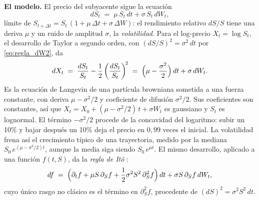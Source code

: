 \noindent\textbf{El modelo.}
El precio del subyacente sigue la ecuación
\begin{equation}\label{eq:bs_eds_P}
  dS_t \;=\; \mu\, S_t\, dt + \sigma\, S_t\, dW_t,
\end{equation}
límite de $S_{t+\Delta t} = S_t\,(1 + \mu\,\Delta t + \sigma\,\Delta W)$:
el rendimiento relativo $dS/S$ tiene una deriva $\mu$ y un ruido de
amplitud $\sigma$, la \emph{volatilidad}. Para el log-precio
$X_t = \log S_t$, el desarrollo de Taylor a segundo orden, con
$(dS/S)^2 = \sigma^2\,dt$ por \eqref{eq:regla_dW2}, da
\begin{equation}\label{eq:logprecio_P}
  dX_t \;=\; \frac{dS_t}{S_t} - \frac{1}{2}\left(\frac{dS_t}{S_t}\right)^{\!2}
  \;=\; \Bigl(\mu - \frac{\sigma^2}{2}\Bigr)\, dt + \sigma\, dW_t .
\end{equation}
Es la ecuación de Langevin de una partícula browniana sometida a una
fuerza constante, con deriva $\mu - \sigma^2/2$ y coeficiente de difusión
$\sigma^2/2$. Sus coeficientes son constantes, así que
$X_t = X_0 + (\mu - \sigma^2/2)\,t + \sigma W_t$ es gaussiano y $S_t$ es
lognormal. El término $-\sigma^2/2$ procede de la concavidad del
logaritmo: subir un 10\% y bajar después un 10\% deja el precio
en $0{,}99$ veces el inicial. La volatilidad frena así el crecimiento
típico de una trayectoria, medido por la mediana
$S_0\,e^{(\mu - \sigma^2/2)t}$, aunque la media siga siendo
$S_0\,e^{\mu t}$. El mismo desarrollo, aplicado a una función
$f(t, S)$, da la \emph{regla de Itô} \cite[sec.~4.3]{tfgm}:
\begin{equation}\label{eq:regla_ito}
  df \;=\; \Bigl(\partial_t f + \mu S\, \partial_S f
  + \frac{1}{2}\sigma^2 S^2\, \partial_S^2 f\Bigr)\, dt
  + \sigma S\, \partial_S f\, dW_t ,
\end{equation}
cuyo único rasgo no clásico es el término en $\partial_S^2 f$, procedente
de $(dS)^2 = \sigma^2 S^2\,dt$.

\medskip


